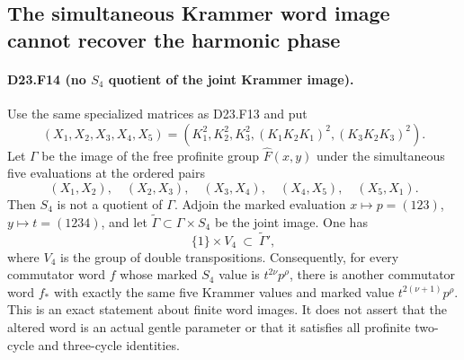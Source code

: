 \subsection{The simultaneous Krammer word image cannot recover the harmonic phase}

\paragraph{D23.F14 (no $S_4$ quotient of the joint Krammer image).}
Use the same specialized matrices as D23.F13 and put
\[
 (X_1,X_2,X_3,X_4,X_5)
 =(K_1^2,K_2^2,K_3^2,(K_1K_2K_1)^2,(K_3K_2K_3)^2).
\]
Let $\Gamma$ be the image of the free profinite group
$\widehat F(x,y)$ under the simultaneous five evaluations
at the ordered pairs
\[
 (X_1,X_2),\quad(X_2,X_3),\quad(X_3,X_4),\quad
 (X_4,X_5),\quad(X_5,X_1).
\tag{D23.F14.1}
\]
Then $S_4$ is not a quotient of $\Gamma$.
Adjoin the marked evaluation $x\mapsto p=(123)$,
$y\mapsto t=(1234)$, and let
$\widetilde\Gamma\subset\Gamma\times S_4$ be the joint
image.  One has
\[
 \{1\}\times V_4\ \subset\ \widetilde\Gamma',
\tag{D23.F14.2}
\]
where $V_4$ is the group of double transpositions.
Consequently, for every commutator word $f$ whose marked
$S_4$ value is $t^{2\nu}p^\rho$, there is another
commutator word $f_*$ with exactly the same five Krammer
values and marked value $t^{2(\nu+1)}p^\rho$.
This is an exact statement about finite word images.
It does not assert that the altered word is an actual
gentle parameter or that it satisfies all profinite
two-cycle and three-cycle identities.

